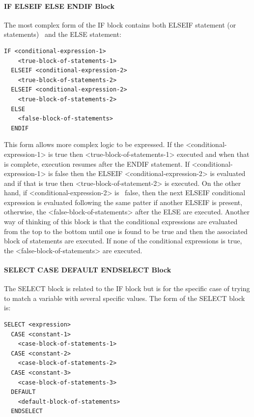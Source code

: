 \paragraph{IF ELSEIF ELSE ENDIF Block}\label{if-elseif-else-endif-block}

The most complex form of the IF block contains both ELSEIF statement (or statements)~ and the ELSE statement:

\begin{lstlisting}
IF <conditional-expression-1>
    <true-block-of-statements-1>
  ELSEIF <conditional-expression-2>
    <true-block-of-statements-2>
  ELSEIF <conditional-expression-2>
    <true-block-of-statements-2>
  ELSE
    <false-block-of-statements>
  ENDIF
\end{lstlisting}

This form allows more complex logic to be expressed. If the \textless{}conditional-expression-1\textgreater{} is true then \textless{}true-block-of-statements-1\textgreater{} executed and when that is complete, execution resumes after the ENDIF statement. If \textless{}conditional-expression-1\textgreater{} is false then the ELSEIF \textless{}conditional-expression-2\textgreater{} is evaluated and if that is true then \textless{}true-block-of-statement-2\textgreater{} is executed. On the other hand, if \textless{}conditional-expression-2\textgreater{} is~ false, then the next ELSEIF conditional expression is evaluated following the same patter if another ELSEIF is present, otherwise, the \textless{}false-block-of-statements\textgreater{} after the ELSE are executed. Another way of thinking of this block is that the conditional expressions are evaluated from the top to the bottom until one is found to be true and then the associated block of statements are executed. If none of the conditional expressions is true, the \textless{}false-block-of-statements\textgreater{} are executed.

\paragraph{SELECT CASE DEFAULT ENDSELECT Block}\label{select-case-default-endselect-block}

The SELECT block is related to the IF block but is for the specific case of trying to match a variable with several specific values. The form of the SELECT block is:

\begin{lstlisting}
SELECT <expression>
  CASE <constant-1>
    <case-block-of-statements-1>
  CASE <constant-2>
    <case-block-of-statements-2>
  CASE <constant-3>
    <case-block-of-statements-3>
  DEFAULT
    <default-block-of-statements>
  ENDSELECT
\end{lstlisting}

